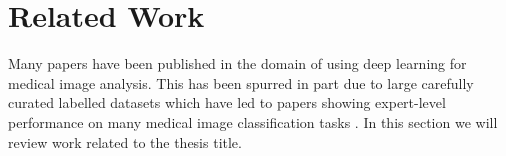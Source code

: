 \section{Related Work}

Many papers have been published in the domain of using deep learning for medical image analysis. This has been spurred in part due to large carefully curated labelled datasets which have led to papers showing expert-level performance on many medical image classification tasks \cite{irvin2019chexpert}. In this section we will review work related to the thesis title. 









